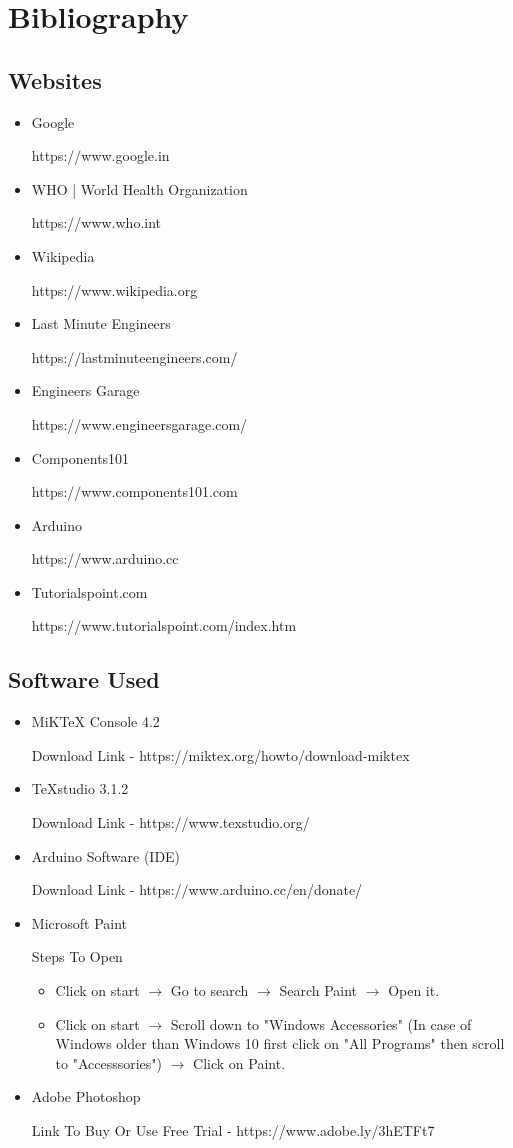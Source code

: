\chapter*{Bibliography}
\section*{Websites}
\begin{itemize}
	\item Google
	
	https://www.google.in
	\item WHO | World Health Organization
	
	https://www.who.int
	
	\item Wikipedia 
	
	https://www.wikipedia.org
	\item Last Minute Engineers
	
	https://lastminuteengineers.com/
	\item Engineers Garage
	
	https://www.engineersgarage.com/
	\item Components101
	
	https://www.components101.com
	\item Arduino
	
	https://www.arduino.cc
	\item Tutorialspoint.com
	
	https://www.tutorialspoint.com/index.htm
\end{itemize}

\section*{Software Used}
	\begin{itemize}
		\item MiKTeX Console 4.2
		
		Download Link - https://miktex.org/howto/download-miktex
		\item TeXstudio 3.1.2
		
		Download Link - https://www.texstudio.org/
		\item Arduino Software (IDE)
		
		Download Link - https://www.arduino.cc/en/donate/
		\item Microsoft Paint
		
		Steps To Open \begin{itemize}
			\item Click on start $\rightarrow$ Go to search $\rightarrow$ Search Paint $\rightarrow$ Open it.
			\item Click on start $\rightarrow$ Scroll down to "Windows Accessories" (In case of Windows older than Windows 10 first click on "All Programs" then scroll to "Accesssories") $\rightarrow$ Click on Paint.
		\end{itemize}
		\item Adobe Photoshop
		
		Link To Buy Or Use Free Trial - https://www.adobe.ly/3hETFt7
	\end{itemize}

